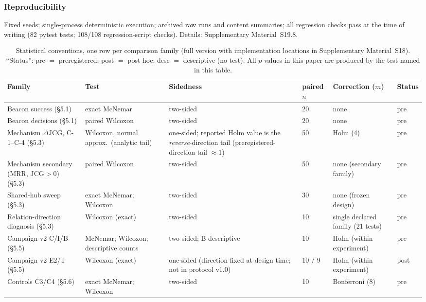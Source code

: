 \documentclass[10pt]{article}
\begin{document}
\subsubsection{Reproducibility}
Fixed seeds; single-process deterministic execution; archived raw runs and content summaries; all regression checks pass at the time of writing (82 pytest tests; 108/108 regression-script checks). Details: Supplementary Material~S19.8.

\begin{table}[t]
\centering\footnotesize
\caption{Statistical conventions, one row per comparison family (full version with implementation locations in Supplementary Material~S18). ``Status'': pre $=$ preregistered; post $=$ post-hoc; desc $=$ descriptive (no test). All $p$ values in this paper are produced by the test named in this table.}
\label{tab:stats}
\begin{tabular}{L{3.0cm}L{3.4cm}L{2.2cm}L{1.1cm}L{2.2cm}L{0.9cm}}
\toprule
\textbf{Family} & \textbf{Test} & \textbf{Sidedness} & \textbf{paired $n$} & \textbf{Correction ($m$)} & \textbf{Status} \\
\midrule
Beacon success (\S5.1) & exact McNemar & two-sided & 20 & none & pre \\
Beacon decisions (\S5.1) & paired Wilcoxon & two-sided & 20 & none & pre \\
Mechanism $\Delta$JCG, C-1--C-4 (\S5.3) & Wilcoxon, normal approx.\ (analytic tail) & one-sided; reported Holm value is the \emph{reverse}-direction tail (preregistered-direction tail ${\approx}1$) & 50 & Holm (4) & pre \\
Mechanism secondary (MRR, JCG${>}0$) (\S5.3) & paired Wilcoxon & two-sided & 50 & none (secondary family) & pre \\
Shared-hub sweep (\S5.3) & exact McNemar; Wilcoxon & two-sided & 30 & none (frozen design) & pre \\
Relation-direction diagnosis (\S5.3) & Wilcoxon (exact) & two-sided & 10 & single declared family (21 tests) & pre \\
Campaign v2 C/I/B (\S5.5) & McNemar; Wilcoxon; descriptive counts & two-sided; B descriptive & 10 & Holm (within experiment) & pre \\
Campaign v2 E2/T (\S5.5) & Wilcoxon (exact) & one-sided (direction fixed at design time; not in protocol v1.0) & 10 / 9 & Holm (within experiment) & post \\
Controls C3/C4 (\S5.6) & exact McNemar; Wilcoxon & two-sided & 10 & Bonferroni (8) & pre \\

\end{tabular}
\end{table}
\end{document}
